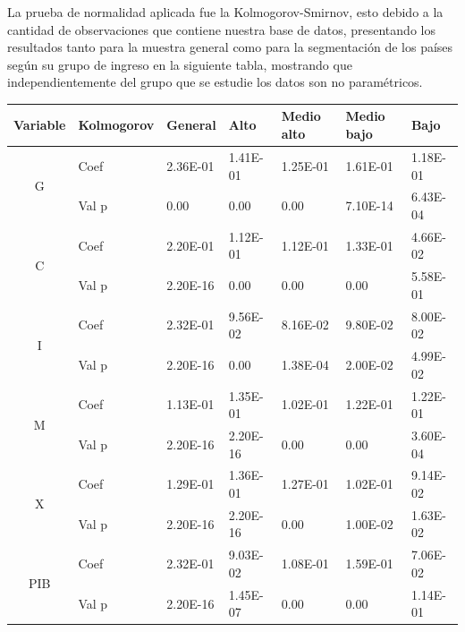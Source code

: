 \documentclass[conference]{IEEEtran}
\begin{document}
La prueba de normalidad aplicada fue la Kolmogorov-Smirnov, esto debido a la cantidad de observaciones que contiene nuestra base de datos, presentando los resultados tanto para la muestra general como para la segmentación de los países según su grupo de ingreso en la siguiente tabla, mostrando que independientemente del grupo que se estudie los datos son no paramétricos.

\begin{table}[h]
\tiny
\centering
\begin{tabular}{|c|l|l|l|l|l|l|}
\hline
\multicolumn{1}{|l|}{Variable} & Kolmogorov & General  & Alto     & Medio alto & Medio bajo & Bajo      \\ \hline
\multirow{2}{*}{G}             & Coef       & 2.36E-01 & 1.41E-01 & 1.25E-01    & 1.61E-01    & 1.18E-01   \\ \cline{2-7} 
                               & Val p      & 0.00     & 0.00     & 0.00       & 7.10E-14   & 6.43E-04 \\ \hline
\multirow{2}{*}{C}             & Coef       & 2.20E-01 & 1.12E-01 & 1.12E-01    & 1.33E-01    & 4.66E-02  \\ \cline{2-7} 
                               & Val p      & 2.20E-16 & 0.00     & 0.00       & 0.00       & 5.58E-01  \\ \hline
\multirow{2}{*}{I}             & Coef       & 2.32E-01 & 9.56E-02 & 8.16E-02    & 9.80E-02    & 8.00E-02  \\ \cline{2-7} 
                               & Val p      & 2.20E-16 & 0.00     & 1.38E-04    & 2.00E-02    & 4.99E-02  \\ \hline
\multirow{2}{*}{M}             & Coef       & 1.13E-01 & 1.35E-01 & 1.02E-01    & 1.22E-01    & 1.22E-01  \\ \cline{2-7} 
                               & Val p      & 2.20E-16 & 2.20E-16 & 0.00       & 0.00       & 3.60E-04  \\ \hline
\multirow{2}{*}{X}             & Coef       & 1.29E-01 & 1.36E-01 & 1.27E-01    & 1.02E-01    & 9.14E-02  \\ \cline{2-7} 
                               & Val p      & 2.20E-16 & 2.20E-16 & 0.00       & 1.00E-02    & 1.63E-02  \\ \hline
\multirow{2}{*}{PIB}           & Coef       & 2.32E-01 & 9.03E-02 & 1.08E-01    & 1.59E-01    & 7.06E-02  \\ \cline{2-7} 
                               & Val p      & 2.20E-16 & 1.45E-07 & 0.00       & 0.00       & 1.14E-01  \\ \hline
\end{tabular}
\end{table}
\end{document}
